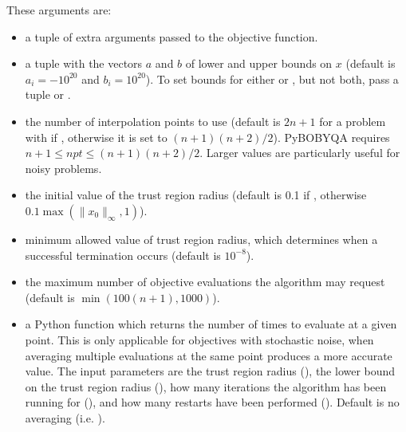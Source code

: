 \documentclass[letterpaper,10pt,english]{sphinxmanual}
\begin{document}
These arguments are:
\begin{itemize}
\item {} 
 \sphinxhyphen{} a tuple of extra arguments passed to the objective function.

\item {} 
 \sphinxhyphen{} a tuple  with the vectors \(a\) and \(b\) of lower and upper bounds on \(x\) (default is \(a_i=-10^{20}\) and \(b_i=10^{20}\)). To set bounds for either  or , but not both, pass a tuple  or .

\item {} 
 \sphinxhyphen{} the number of interpolation points to use (default is \(2n+1\) for a problem with  if , otherwise it is set to \((n+1)(n+2)/2\)). Py\sphinxhyphen{}BOBYQA requires \(n+1 \leq npt \leq (n+1)(n+2)/2\). Larger values are particularly useful for noisy problems.

\item {} 
 \sphinxhyphen{} the initial value of the trust region radius (default is 0.1 if , otherwise \(0.1\max(\|x_0\|_{\infty}, 1)\)).

\item {} 
 \sphinxhyphen{} minimum allowed value of trust region radius, which determines when a successful termination occurs (default is \(10^{-8}\)).

\item {} 
 \sphinxhyphen{} the maximum number of objective evaluations the algorithm may request (default is \(\min(100(n+1),1000)\)).

\item {} 
 \sphinxhyphen{} a Python function  which returns the number of times to evaluate  at a given point. This is only applicable for objectives with stochastic noise, when averaging multiple evaluations at the same point produces a more accurate value. The input parameters are the trust region radius (), the lower bound on the trust region radius (), how many iterations the algorithm has been running for (), and how many restarts have been performed (). Default is no averaging (i.e. ).


\end{itemize}
\end{document}
